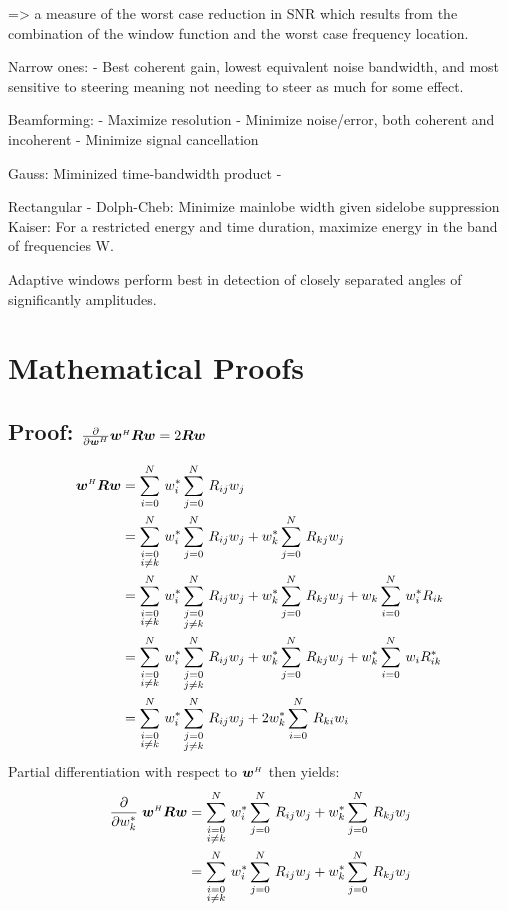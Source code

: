 => a measure of the worst case reduction in SNR which results from the combination of the window function and the worst case frequency location.


Narrow ones:
- Best coherent gain, lowest equivalent noise bandwidth, and most sensitive to steering meaning not needing to steer as much for some effect.


Beamforming:
- Maximize resolution
- Minimize noise/error, both coherent and incoherent
- Minimize signal cancellation

Gauss: Miminized time-bandwidth product
  - 
  
Rectangular
  - 
Dolph-Cheb: Minimize mainlobe width given sidelobe suppression
Kaiser: For a restricted energy and time duration, maximize energy in the band of frequencies W.

Adaptive windows perform best in detection of closely separated angles of significantly amplitudes.


\section{Mathematical Proofs}

\subsection[Proof d/dw\^{}H w\^{}HRw = 2Rw]{Proof: $\frac{\partial}{\partial\boldsymbol{w}^{\scriptscriptstyle H}} \boldsymbol{w}^{\scriptscriptstyle H}\boldsymbol{R}\boldsymbol{w} = 2\boldsymbol{R}\boldsymbol{w}$}

\begin{align}
\boldsymbol{w}^{\scriptscriptstyle H}\boldsymbol{R}\boldsymbol{w} &= \sum\limits_{i=0}^{N}\,w_i^* \sum\limits_{j=0}^{N}\,  R_{ij} w_j \nonumber\\
&= \sum\limits_{\substack{i=0\\i\ne k}}^{N}\, w_i^* \sum\limits_{j=0}^{N}\, R_{ij} w_j + w_k^*\sum\limits_{j=0}^{N}\, R_{kj} w_j \nonumber\\
&= \sum\limits_{\substack{i=0\\i\ne k}}^{N}\, w_i^* \sum\limits_{\substack{j=0\\j\ne k}}^{N}\, R_{ij} w_j + w_k^*\sum\limits_{j=0}^{N}\, R_{kj} w_j + w_k\sum\limits_{i=0}^{N}\,w_i^* R_{ik} \nonumber\\
&= \sum\limits_{\substack{i=0\\i\ne k}}^{N}\, w_i^* \sum\limits_{\substack{j=0\\j\ne k}}^{N}\, R_{ij} w_j + w_k^*\sum\limits_{j=0}^{N}\, R_{kj} w_j + w_k^*\sum\limits_{i=0}^{N}\,w_i R_{ik}^* \nonumber\\
&= \sum\limits_{\substack{i=0\\i\ne k}}^{N}\, w_i^* \sum\limits_{\substack{j=0\\j\ne k}}^{N}\, R_{ij} w_j + 2w_k^*\sum\limits_{i=0}^{N}\, R_{ki} w_i
\end{align}
%
Partial differentiation with respect to $\boldsymbol{w}^{\scriptscriptstyle H}$ then yields:
%
\begin{align}
\frac{\partial}{\partial w_k^*}\;\boldsymbol{w}^{\scriptscriptstyle H}\boldsymbol{R}\boldsymbol{w}
&= \sum\limits_{\substack{i=0\\i\ne k}}^{N}\, w_i^* \sum\limits_{j=0}^{N}\, R_{ij} w_j + w_k^*\sum\limits_{j=0}^{N}\, R_{kj} w_j \nonumber\\
&= \sum\limits_{\substack{i=0\\i\ne k}}^{N}\, w_i^* \sum\limits_{j=0}^{N}\, R_{ij} w_j + w_k^*\sum\limits_{j=0}^{N}\, R_{kj} w_j
\end{align}
